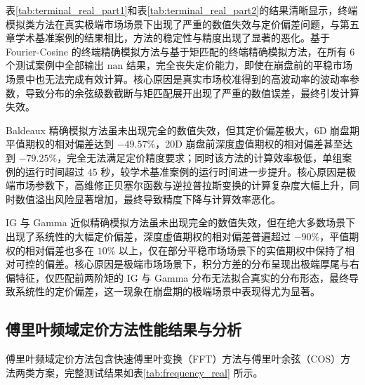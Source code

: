 表\ref{tab:terminal_real_part1}和表\ref{tab:terminal_real_part2}的结果清晰显示，终端模拟类方法在真实极端市场场景下出现了严重的数值失效与定价偏差问题，与第五章学术基准案例的结果相比，方法的稳定性与精度出现了显著的恶化。基于 Fourier-Cosine 的终端精确模拟方法与基于矩匹配的终端精确模拟方法，在所有 6 个测试案例中全部输出 $\mathrm{nan}$ 结果，完全丧失定价能力，即使在崩盘前的平稳市场场景中也无法完成有效计算。核心原因是真实市场校准得到的高波动率的波动率参数，导致分布的余弦级数截断与矩匹配展开出现了严重的数值误差，最终引发计算失效。

Baldeaux 精确模拟方法虽未出现完全的数值失效，但其定价偏差极大，6D 崩盘期平值期权的相对偏差达到 $-49.57\%$，20D 崩盘前深度虚值期权的相对偏差甚至达到 $-79.25\%$，完全无法满足定价精度要求；同时该方法的计算效率极低，单组案例的运行时间超过 45 秒，较学术基准案例的运行时间进一步提升。核心原因是极端市场参数下，高维修正贝塞尔函数与逆拉普拉斯变换的计算复杂度大幅上升，同时数值溢出风险显著增加，最终导致精度下降与计算效率恶化。

IG 与 Gamma 近似精确模拟方法虽未出现完全的数值失效，但在绝大多数场景下出现了系统性的大幅定价偏差，深度虚值期权的相对偏差普遍超过 $-90\%$，平值期权的相对偏差也多在 $10\%$ 以上，仅在部分平稳市场场景下的实值期权中保持了相对可控的偏差。核心原因是极端市场场景下，积分方差的分布呈现出极端厚尾与右偏特征，仅匹配前两阶矩的 IG 与 Gamma 分布无法拟合真实的分布形态，最终导致系统性的定价偏差，这一现象在崩盘期的极端场景中表现得尤为显著。

\subsection{傅里叶频域定价方法性能结果与分析}

傅里叶频域定价方法包含快速傅里叶变换（FFT）方法与傅里叶余弦（COS）方法两类方案，完整测试结果如表\ref{tab:frequency_real} 所示。

